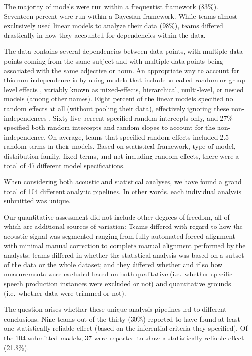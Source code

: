 \documentclass[Review,times,sageh]{sagej}
\begin{document}
The majority of models were run within a frequentist framework (83\%).
Seventeen percent were run within a Bayesian framework.
While teams almost exclusively used linear models to analyze their data (98\%), teams differed drastically in how they accounted for dependencies within the data.

The data contains several dependencies between data points, with multiple data points coming from the same subject and with multiple data points being associated with the same adjective or noun.
An appropriate way to account for this non-independence is by using models that include so-called random or group level effects \citep[e.g.,][]{gelman2006data, schielzeth2009conclusions}, variably known as mixed-effects, hierarchical, multi-level, or nested models (among other names).
Eight percent of the linear models specified no random effects at all (without pooling their data), effectively ignoring these non-independences \citep{hurlbert1984pseudoreplication}.
Sixty-five percent specified random intercepts only, and 27\% specified both random intercepts and random slopes to account for the non-independence.
On average, teams that specified random effects included 2.5 random terms in their models.
Based on statistical framework, type of model, distribution family, fixed terms, and not including random effects, there were a total of 47 different model specifications.

When considering both acoustic and statistical analyses, we have found a grand total of 104 different analytic pipelines.
In other words, each individual analysis submitted was unique.

Our quantitative assessment did not include other degrees of freedom, all of which are additional sources of variation:
Teams differed with regard to how the acoustic signal was segmented ranging from fully automated forced-alignment with minimal manual correction to complete manual alignment performed by the analysts; teams differed in whether the statistical analysis was based on a subset of the data or the whole dataset; and they differed whether and if so how measurements were excluded based on both qualitative (i.e.~whether specific speech production instances were excluded or not) and quantitative grounds (i.e.~whether data were trimmed or not).

The question arises whether these unique analysis pipelines led to different conclusions.
Nine teams out of the thirty (30\%) reported to have found at least one statistically reliable effect (based on the inferential criteria they specified).
Of the 104 submitted models, 37 were reported to show a statistically reliable effect (21.8\%).
\end{document}
